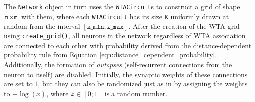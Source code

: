 \\ \ \\
The \texttt{Network} object in turn uses the \texttt{WTACircuit}s to construct a grid of shape $\texttt{n}\times\texttt{m}$ with them, where each \texttt{WTACircuit} has its size \texttt{K} uniformly drawn at random from the interval $[\texttt{k\_min}, \texttt{k\_max}]$. After the creation of the WTA grid using \texttt{create\_grid()}, all neurons in the network regardless of WTA association are connected to each other with probability derived from the distance-dependent probability rule from Equation \ref{eqn:distance_dependent_probability}. Additionally, the formation of \textit{autapses} (self-recurrent connections from the neuron to itself) are disabled. Initially, the synaptic weights of these connections are set to $1$, but they can also be randomized just as in \parencite{klampfl_maass_2013} by assigning the weights to $-\log(x)$, where $x\in[0; 1]$ is a random number.

